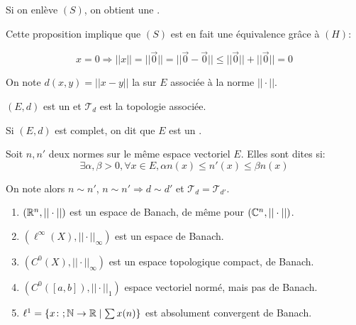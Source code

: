 \documentclass[french,a4paper,10pt]{article}
\begin{document}
    Si on enlève $(S)$, on obtient une .

    Cette proposition implique que $(S)$ est en fait une équivalence grâce à $(H)$:

    \[
        x=0 \Rightarrow ||x|| = ||\overrightarrow{0}|| = ||\overrightarrow{0} - \overrightarrow{0}|| \leq ||\overrightarrow{0}|| + ||\overrightarrow{0}|| = 0
    \]

    \begin{notation}
        On note $d(x,y)=||x-y||$ la  sur $E$ associée à la norme $||\cdot||$.

        $(E, d)$ est un  et $\mathcal T_d$ est la topologie associée.

        Si $(E, d)$ est complet, on dit que $E$ est un .
    \end{notation}

    \begin{definition}
        Soit $n,n'$ deux normes sur le même espace vectoriel $E$. Elles sont dites
         si:
        \[
            \exists\alpha, \beta > 0, \forall x \in E, \alpha n(x) \leq n'(x) \leq \beta n(x)
        \]

        On note alors $n \sim n'$, $n\sim n' \Rightarrow d \sim d'$ et $\mathcal T_d = \mathcal T_{d'}$.
    \end{definition}

    \begin{example}
        \begin{enumerate}
            \item $(\mathbb{R}^n,||\cdot||)$ est un espace de Banach, de même pour $(\mathbb{C}^n,||\cdot||)$.
            \item $\left(\ell^\infty(X), ||\cdot||_\infty\right)$ est un espace de Banach.
            \item $\left(C^0(X), ||\cdot||_\infty\right)$ est un espace topologique compact, de Banach.
            \item $\left(C^0([a,b]), ||\cdot||_1\right)$ espace vectoriel normé, mais pas de Banach.
            \item $\ell^1=\{x\colon;\mathbb{N}\to\mathbb{R} \mid \sum x(n)\}$ est absolument convergent de Banach.
        \end{enumerate}
    \end{example}


\end{document}
